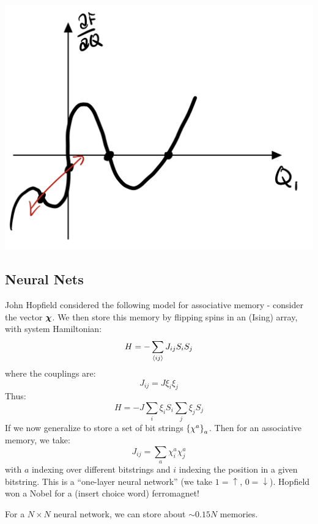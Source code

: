 \begin{center}
    \includegraphics[scale=0.35]{Lectures/Figures/lec15-dFdQ.png}
\end{center}

\subsection{Neural Nets}
John Hopfield considered the following model for associative memory - consider the vector $\mbox{\boldmath$ \chi $}$. We then store this memory by flipping spins in an (Ising) array, with system Hamiltonian:
\begin{equation}
    H = -\sum_{\left< ij \right>}J_{ij}S_iS_j
\end{equation}
where the couplings are:
\begin{equation}
    J_{ij} = J\xi_i\xi_j
\end{equation}
Thus:
\begin{equation}
    H = -J\sum_i \xi_i S_i \sum_j \xi_j S_j
\end{equation}
If we now generalize to store a set of bit strings $\set{\chi^a}_a$. Then for an associative memory, we take:
\begin{equation}
    J_{ij} = \sum_a \chi_i^a \chi_j ^a
\end{equation}
with $a$ indexing over different bitstrings and $i$ indexing the position in a given bitstring. This is a ``one-layer neural network'' (we take $1 = \uparrow$, $0 = \downarrow$). Hopfield won a Nobel for a (insert choice word) ferromagnet!

For a $N \times N$ neural network, we can store about $\sim 0.15N$ memories. 

